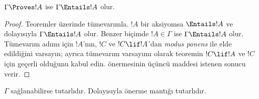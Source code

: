 \documentclass[../../../include/open-logic-section]{subfiles}
\begin{document}


\begin{thm}[Sağlamlık]
$\Gamma\Proves!A$ ise $\Gamma \Entails !A$ olur.
\end{thm}

\begin{proof}
Teoremler üzerinde tümevarımla. $!A$ bir aksiyomsa $\Entails
!A$ ve dolayısıyla $\Gamma \Entails!A$ olur. Benzer biçimde
$!A \in \Gamma$ ise $\Gamma \Entails!A$ olur. Tümevarım adımı için $!A$'nın,
$!C$ ve $!C\lif!A$'dan \emph{modus ponens} ile elde edildiğini varsayın;
ayrıca tümevarım varsayımı olarak teoremin $!C\lif !A$ ve $!C$ için geçerli
olduğunu kabul edin.  önermesinin üçüncü
maddesi istenen sonucu verir.
\end{proof}

\begin{cor}
$\Gamma$ sağlanabilirse tutarlıdır. Dolayısıyla önerme mantığı tutarlıdır.
\end{cor}
\end{document}

